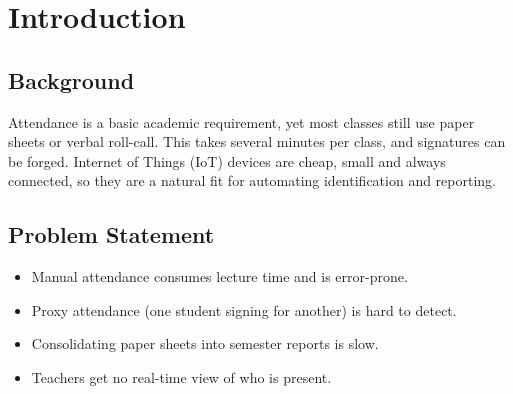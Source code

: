 \documentclass[11pt,a4paper]{article}
\begin{document}
\begin{abstract}
Manual roll-call wastes class time and is prone to proxy attendance and recording errors. This proposal describes an IoT-based attendance system in which a classroom device built around an ESP32 microcontroller reads RFID cards (and QR codes) of students, validates the scan, and sends it over Wi-Fi using MQTT/HTTPS to a Java server. Teachers see live attendance on a dashboard and obtain reports automatically. The document presents the problem, objectives, requirements, hardware and software architecture, an Iterative-Incremental development plan with schedule, milestones, deliverables and Gantt chart, the six required UML diagrams, a risk and cost analysis, and a simple Java prototype with more than five classes taken from the class diagram.
\end{abstract}
 
\newpage
\tableofcontents
\newpage
 
\section{Introduction}
\subsection{Background}
Attendance is a basic academic requirement, yet most classes still use paper sheets or verbal roll-call. This takes several minutes per class, and signatures can be forged. Internet of Things (IoT) devices are cheap, small and always connected, so they are a natural fit for automating identification and reporting.
 
\subsection{Problem Statement}
\begin{itemize}[noitemsep]
  \item Manual attendance consumes lecture time and is error-prone.
  \item Proxy attendance (one student signing for another) is hard to detect.
  \item Consolidating paper sheets into semester reports is slow.
  \item Teachers get no real-time view of who is present.
\end{itemize}
 
\end{document}

